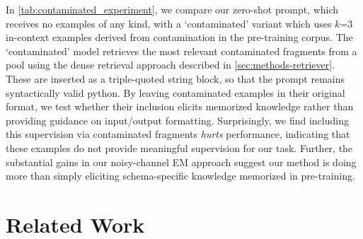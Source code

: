 \documentclass[11pt]{article}
\begin{document}
In \autoref{tab:contaminated_experiment}, we compare our zero-shot prompt, which receives no examples of any kind, with a `contaminated' variant which uses $k$=3 in-context examples derived from contamination in the pre-training corpus.
The `contaminated' model retrieves the most relevant contaminated fragments from a pool using the dense retrieval approach described in \autoref{sec:methods-retriever}. 
These are inserted as a triple-quoted string block, so that the prompt remains syntactically valid python.
By leaving contaminated examples in their original format, we test whether their inclusion elicits memorized knowledge rather than providing guidance on input/output formatting.
Surprisingly, we find including this supervision via contaminated fragments \textit{hurts} performance, indicating that these examples do not provide meaningful supervision for our task.
Further, the substantial gains in our noisy-channel EM approach suggest our method is doing more than simply eliciting schema-specific knowledge memorized in pre-training.
 
\begin{table}[]
    \centering
    \caption{Performance comparison when we include contaminated in-context examples. We find \textit{including} this supervision hurts performance, and does not explain the strong performance of our noisy-channel EM approach}
    \label{tab:contaminated_experiment}
\end{table}

\section{Related Work}
\label{sec:related-work}
\end{document}
